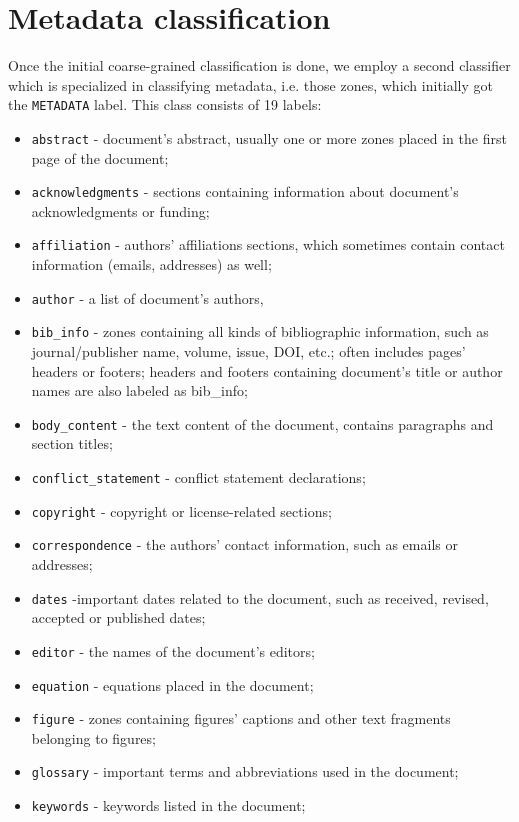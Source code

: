 \section{Metadata classification}
Once the initial coarse-grained classification is done, we employ a second classifier which is specialized in classifying metadata, i.e. those zones, which initially got the \verb+METADATA+ label. This class consists of 19 labels:
\begin{itemize}
    \item \verb+abstract+ - document's abstract, usually one or more zones placed in the first page of the document;
    \item \verb+acknowledgments+ - sections containing information about document's acknowledgments or funding;
    \item \verb+affiliation+ - authors' affiliations sections, which sometimes contain contact information (emails, addresses) as well;
    \item \verb+author+ - a list of document's authors,
    \item \verb+bib_info+ - zones containing all kinds of bibliographic information, such as journal/publisher name, volume, issue, DOI, etc.; often includes pages' headers or footers; headers and footers containing document's title or author names are also labeled as bib\_info;
    \item \verb+body_content+ - the text content of the document, contains paragraphs and section titles;
    \item \verb+conflict_statement+ - conflict statement declarations;
    \item \verb+copyright+ - copyright or license-related sections;
    \item \verb+correspondence+ - the authors' contact information, such as emails or addresses;
    \item \verb+dates+ -important dates related to the document, such as received, revised, accepted or published dates;
    \item \verb+editor+ - the names of the document's editors;
    \item \verb+equation+ - equations placed in the document;
    \item \verb+figure+ - zones containing figures' captions and other text fragments belonging to figures;
    \item \verb+glossary+ - important terms and abbreviations used in the document;
    \item \verb+keywords+ - keywords listed in the document;

\end{itemize}
